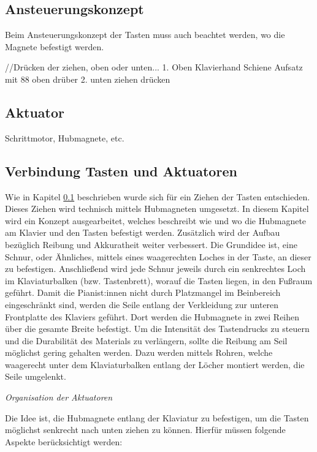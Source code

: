 \subsection{Ansteuerungskonzept} \label{konzeptionHW-ansteuerungskonzept}
Beim Ansteuerungskonzept der Tasten muss auch beachtet werden, wo die Magnete befestigt werden.

//Drücken der ziehen, oben oder unten...
1. Oben
Klavierhand
Schiene
Aufsatz mit 88 oben drüber
2. unten
ziehen
drücken

\subsection{Aktuator}\label{subsec:aktuator}

Schrittmotor, Hubmagnete, etc.

\subsection{Verbindung Tasten und Aktuatoren}

Wie in Kapitel \ref{konzeptionHW-ansteuerungskonzept} beschrieben wurde sich für ein Ziehen der Tasten entschieden.
Dieses Ziehen wird technisch mittels Hubmagneten umgesetzt.
In diesem Kapitel wird ein Konzept ausgearbeitet, welches beschreibt wie und wo die Hubmagnete am Klavier und den Tasten befestigt werden.
Zusätzlich wird der Aufbau bezüglich Reibung und Akkuratheit weiter verbessert.
\newline
Die Grundidee ist, eine Schnur, oder Ähnliches, mittels eines waagerechten Loches in der Taste, an dieser zu befestigen.
Anschließend wird jede Schnur jeweils durch ein senkrechtes Loch im Klaviaturbalken (bzw. Tastenbrett), worauf die Tasten liegen, in den Fußraum geführt.
Damit die Pianist:innen nicht durch Platzmangel im Beinbereich eingeschränkt sind,
werden die Seile entlang der Verkleidung zur unteren Frontplatte des Klaviers geführt.
Dort werden die Hubmagnete in zwei Reihen über die gesamte Breite befestigt.
Um die Intensität des Tastendrucks zu steuern und die Durabilität des Materials zu verlängern, sollte die Reibung am Seil möglichst gering gehalten werden.
Dazu werden mittels Rohren, welche waagerecht unter dem Klaviaturbalken entlang der Löcher montiert werden, die Seile umgelenkt.

\textit{Organisation der Aktuatoren}

Die Idee ist, die Hubmagnete entlang der Klaviatur zu befestigen, um die Tasten möglichst senkrecht nach unten ziehen zu können.
Hierfür müssen folgende Aspekte berücksichtigt werden:

